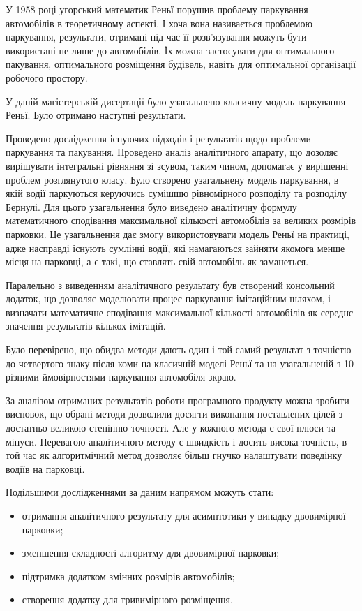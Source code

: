
У 1958 році угорський математик Реньї порушив проблему паркування автомобілів в теоретичному аспекті. І хоча вона називається проблемою паркування, результати, отримані під час її розв'язування можуть бути використані не лише до автомобілів. Їх можна застосувати для оптимального пакування, оптимального розміщення будівель, навіть для оптимальної організації робочого простору.

У даній магістерській дисертації було узагальнено класичну модель паркування Реньї. Було отримано наступні результати.

Проведено дослідження існуючих підходів і результатів щодо проблеми паркування та пакування. Проведено аналіз аналітичного апарату, що дозоляє вирішувати інтегральні рівняння зі зсувом, таким чином, допомагає у вирішенні проблем розглянутого класу. Було створено узагальнену модель паркування, в якій водії паркуються керуючись сумішшю рівномірного розподілу та розподілу Бернулі. Для цього узагальнення було виведено аналітичну формулу математичного сподівання максимальної кількості автомобілів за великих розмірів парковки. Це узагальнення дає змогу використовувати модель Реньї на практиці, адже насправді існують сумлінні водії, які намагаються зайняти якомога менше місця на парковці, а є такі, що ставлять свій автомобіль як заманеться.

Паралельно з виведенням аналітичного результату був створений консольний додаток, що дозволяє моделювати процес паркування імітаційним шляхом, і визначати математичне сподівання максимальної кількості автомобілів як середнє значення результатів кількох імітацій.

Було перевірено, що обидва методи дають один і той самий результат з точністю до четвертого знаку після коми на класичній моделі Реньї та на узагальненій з 10 різними ймовірностями паркування автомобіля зкраю.

За аналізом отриманих результатів роботи програмного продукту можна зробити висновок, що обрані методи дозволили досягти виконання поставлених цілей з достатньо великою степінню точності. Але у кожного метода є свої плюси та мінуси. Перевагою аналітичного методу є швидкість і досить висока точність, в той час як алгоритмічний метод дозволяє більш гнучко налаштувати поведінку водіїв на парковці.

Подільшими дослідженнями за даним напрямом можуть стати:
\begin{itemize}
\item отримання аналітичного результату для асимптотики у випадку двовимірної парковки;
\item зменшення складності алгоритму для двовимірної парковки;
\item підтримка додатком змінних розмірів автомобілів;
\item створення додатку для тривимірного розміщення.
\end{itemize}

